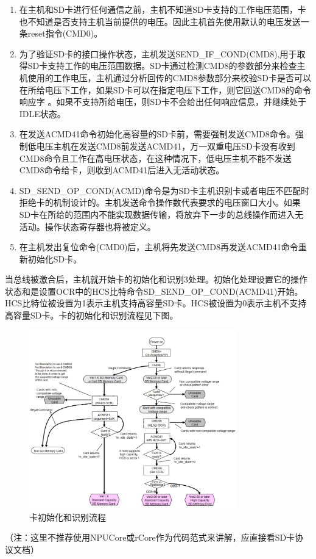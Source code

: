 \begin{enumerate}
	\item 在主机和SD卡进行任何通信之前，主机不知道SD卡支持的工作电压范围，卡也不知道是否支持主机当前提供的电压。因此主机首先使用默认的电压发送一条reset指令(CMD0)。
	\item 为了验证SD卡的接口操作状态，主机发送SEND\_IF\_COND(CMD8),用于取得SD卡支持工作的电压范围数据。SD卡通过检测CMD8的参数部分来检查主机使用的工作电压，主机通过分析回传的CMD8参数部分来校验SD卡是否可以在所给电压下工作，如果SD卡可以在指定电压下工作，则它回送CMD8的命令响应字 。如果不支持所给电压，则SD卡不会给出任何响应信息，并继续处于IDLE状态。
	\item 在发送ACMD41命令初始化高容量的SD卡前，需要强制发送CMD8命令。强制低电压主机在发送CMD8前发送ACMD41，万一双重电压SD卡没有收到CMD8命令且工作在高电压状态，在这种情况下，低电压主机不能不发送CMD8命令给卡，则收到ACMD41后进入无活动状态。
	\item SD\_SEND\_OP\_COND(ACMD)命令是为SD卡主机识别卡或者电压不匹配时拒绝卡的机制设计的。主机发送命令操作数代表要求的电压窗口大小。如果SD卡在所给的范围内不能实现数据传输，将放弃下一步的总线操作而进入无活动。操作状态寄存器也将被定义。
	\item 在主机发出复位命令(CMD0)后，主机将先发送CMD8再发送ACMD41命令重新初始化SD卡。
\end{enumerate}

当总线被激合后，主机就开始卡的初始化和识别3处理。初始化处理设置它的操作状态和是设置OCR中的HCS比特命令SD\_SEND\_OP\_COND(ACMD41)开始。HCS比特位被设置为1表示主机支持高容量SD卡。HCS被设置为0表示主机不支持高容量SD卡。卡的初始化和识别流程见下图。

\begin{figure}[H]
    \centering
    \includegraphics[width=0.8\textwidth]{figures/06-02-初始化.png}
    \caption{卡初始化和识别流程}
\end{figure}
（注：这里不推荐使用NPUCore或rCore作为代码范式来讲解，应直接看SD卡协议文档）

